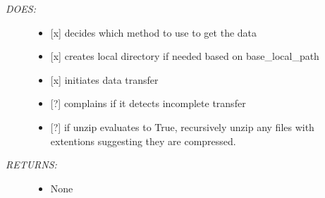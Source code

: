 \documentclass[letterpaper,10pt,english]{sphinxmanual}
\begin{document}
\begin{fulllineitems}
\begin{fulllineitems}
\begin{description}
\item[{\emph{DOES:}}] \leavevmode\begin{itemize}
\item {} 
{[}x{]} decides which method to use to get the data

\item {} 
{[}x{]} creates local directory if needed based on base\_local\_path

\item {} 
{[}x{]} initiates data transfer

\item {} 
{[}?{]} complains if it detects incomplete transfer

\item {} 
{[}?{]} if unzip evaluates to True, recursively unzip any files
with extentions suggesting they are compressed.

\end{itemize}

\item[{\emph{RETURNS:}}] \leavevmode\begin{itemize}
\item {} 
None

\end{itemize}

\end{description}

\end{fulllineitems}


\end{fulllineitems}

\end{document}
